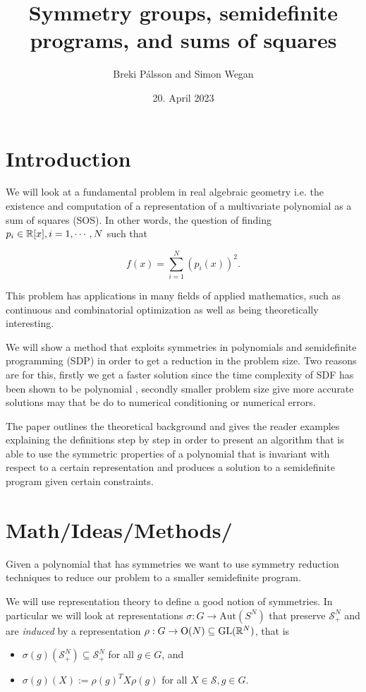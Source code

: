 \documentclass[]{article}
\begin{document}
\title{Symmetry groups, semidefinite programs, and sums of squares}
\author{Breki Pálsson and Simon Wegan}
\date{20. April 2023}

\maketitle

\section{Introduction}
We will look at a fundamental problem in real algebraic geometry i.e. the existence and computation of a
representation of a multivariate polynomial as a sum of squares (SOS). In other words, the
question of finding $p_i \in \mathbb R[x], i = 1, \cdots, N$ such that

\[f(x) = \sum_{i=1}^{N}(p_i(x))^2.\]

This problem has applications in many fields of applied mathematics, such as continuous and combinatorial optimization as well as being theoretically interesting. 


We will show a method that exploits symmetries in polynomials and semidefinite programming (SDP) in order to get a reduction in the problem size. 
Two reasons are for this, firstly we get a faster solution since the time complexity of SDF has been shown to be polynomial , 
secondly smaller problem size give more accurate solutions may that be do to numerical conditioning or numerical errors.


The paper outlines the theoretical background and gives the reader examples explaining the definitions step by step in order to present an algorithm that is able to use the 
symmetric properties of a polynomial that is invariant with respect to a certain representation and produces a solution to a semidefinite program given certain constraints.

\section{Math/Ideas/Methods/}

Given a polynomial that has symmetries we want to use symmetry reduction techniques to reduce our problem to a smaller semidefinite program.

We will use representation theory to define a good notion of symmetries. In particular we will look at representations
$\sigma:G\rightarrow \mathrm{Aut}(S^N)$ that preserve $\mathcal{S}_+^N$ and are \textit{induced} by a representation $\rho:G\rightarrow \mathrm{O}(N)\subseteq\mathrm{GL}(\mathbb R^N)$, 
that is 
\begin{itemize}
    \item $\sigma(g)(\mathcal{S}_+^N)\subseteq \mathcal{S}_+^N$ for all $g\in G$, and
    \item $\sigma(g)(X) := \rho(g)^TX\rho(g)$ for all $X\in \mathcal{S} , g\in G.$
\end{itemize}
\end{document}
